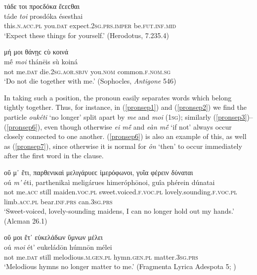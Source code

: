 \begin{exe}
\ex τάδε τοι προϲδόκα ἔϲεϲθαι\\
\gll táde \emph{toi} prosdóka ésesthai\\
this.\textsc{n.acc.pl} you.\textsc{dat} expect.\textsc{2sg.prs.imper} be.\textsc{fut.inf.mid}\\
\trans `Expect these things for yourself.' (Herodotus, 7.235.4)
\label{ptcp5}
\end{exe}

\begin{exe}
\ex μή μοι θάνῃϲ ϲὺ κοινά\\
\gll mḗ \emph{moi} thánēis sù koiná\\
not me.\textsc{dat} die.\textsc{2sg.aor.sbjv} you.\textsc{nom} common.\textsc{f.nom.sg}\\
\trans `Do not die together with me.' (Sophocles, \textit{Antigone} 546)
\label{ptcp6}
\end{exe}

In taking such a position, the pronoun easily separates words which belong tightly together. Thus, for instance, in (\ref{pronsep1}) and (\ref{pronsep2}) we find the particle \textit{oukéti} `no longer' split apart by \textit{me} and \textit{moi} (\textsc{1sg}); similarly (\ref{pronsep3})--(\ref{pronsep6}), even though otherwise \textit{ei mḗ} and \textit{eàn mḗ} `if not' always occur closely connected to one another. (\ref{pronsep6}) is also an example of this, as well as (\ref{pronsep7}), since otherwise it is normal for \textit{ôn} `then' to occur immediately after the first word in the clause. 

\begin{exe}
\ex οὔ μ᾽ ἔτι, παρθενικαὶ μελιγάρυεϲ ἱμερόφωνοι, γυῖα φέρειν δύναται\\
\gll oú \emph{m'} éti, parthenikaì meligárues himeróphōnoi, guîa phérein dúnatai\\
not me.\textsc{acc} still maiden.\textsc{voc.pl} sweet.voiced.\textsc{f.voc.pl} lovely.sounding.\textsc{f.voc.pl} limb.\textsc{acc.pl} bear.\textsc{inf.prs} can.\textsc{3sg.prs}\\
\trans `Sweet-voiced, lovely-sounding maidens, I can no longer hold out my hands.' (Alcman 26.1)
\label{pronsep1}
\end{exe}

\begin{exe}
\ex οὔ μοι ἔτ᾽ εὐκελάδων ὕμνων μέλει\\
\gll oú \emph{moi} ét' eukeládōn húmnōn mélei\\
not me.\textsc{dat} still melodious.\textsc{m.gen.pl} hymn.\textsc{gen.pl} matter.\textsc{3sg.prs}\\
\trans `Melodious hymns no longer matter to me.' (Fragmenta Lyrica Adespota 5; \citealp[690]{Bergk1882})
\label{pronsep2}
\end{exe}

